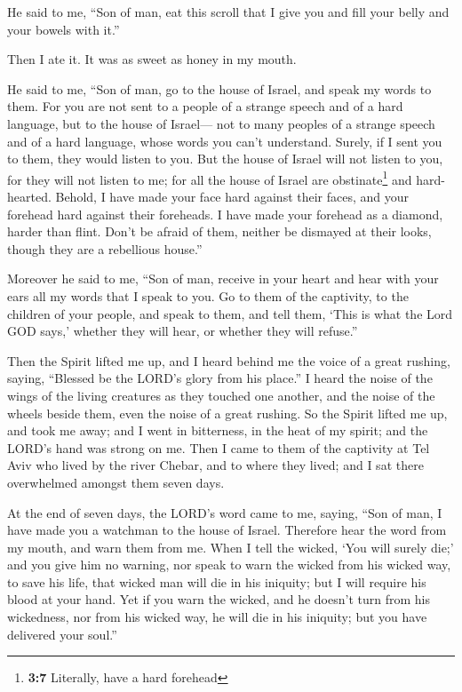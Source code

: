  He said to me, ``Son of man, eat this scroll that I give
you and fill your belly and your bowels with it.''

Then I ate it. It was as sweet as honey in my mouth.

 He said to me, ``Son of man, go to the house of Israel,
and speak my words to them.  For you are not sent to a
people of a strange speech and of a hard language, but to the house of
Israel---  not to many peoples of a strange speech and of
a hard language, whose words you can't understand. Surely, if I sent you
to them, they would listen to you.  But the house of
Israel will not listen to you, for they will not listen to me; for all
the house of Israel are obstinate\footnote{\textbf{3:7} Literally, have
  a hard forehead} and hard-hearted.  Behold, I have made
your face hard against their faces, and your forehead hard against their
foreheads.  I have made your forehead as a diamond, harder
than flint. Don't be afraid of them, neither be dismayed at their looks,
though they are a rebellious house.''

 Moreover he said to me, ``Son of man, receive in your
heart and hear with your ears all my words that I speak to you.
 Go to them of the captivity, to the children of your
people, and speak to them, and tell them, `This is what the Lord GOD
says,' whether they will hear, or whether they will refuse.''

 Then the Spirit lifted me up, and I heard behind me the
voice of a great rushing, saying, ``Blessed be the LORD's glory from his
place.''  I heard the noise of the wings of the living
creatures as they touched one another, and the noise of the wheels
beside them, even the noise of a great rushing.  So the
Spirit lifted me up, and took me away; and I went in bitterness, in the
heat of my spirit; and the LORD's hand was strong on me. 
Then I came to them of the captivity at Tel Aviv who lived by the river
Chebar, and to where they lived; and I sat there overwhelmed amongst
them seven days.

 At the end of seven days, the LORD's word came to me,
saying,  ``Son of man, I have made you a watchman to the
house of Israel. Therefore hear the word from my mouth, and warn them
from me.  When I tell the wicked, `You will surely die;'
and you give him no warning, nor speak to warn the wicked from his
wicked way, to save his life, that wicked man will die in his iniquity;
but I will require his blood at your hand.  Yet if you
warn the wicked, and he doesn't turn from his wickedness, nor from his
wicked way, he will die in his iniquity; but you have delivered your
soul.''

